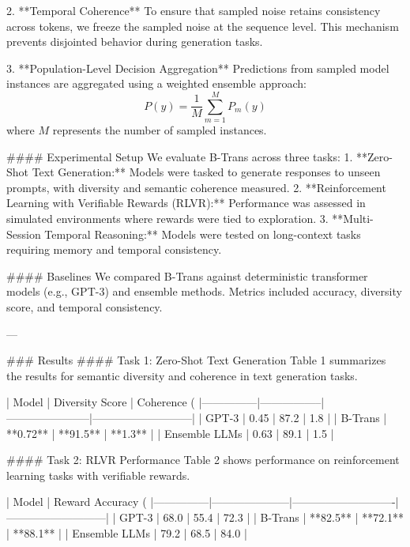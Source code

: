2. **Temporal Coherence**  
   To ensure that sampled noise retains consistency across tokens, we freeze the sampled noise at the sequence level. This mechanism prevents disjointed behavior during generation tasks.

3. **Population-Level Decision Aggregation**  
   Predictions from sampled model instances are aggregated using a weighted ensemble approach:  
   \[
   P(y) = \frac{1}{M} \sum_{m=1}^{M} P_{m}(y)
   \]  
   where \(M\) represents the number of sampled instances.

#### Experimental Setup  
We evaluate B-Trans across three tasks:  
1. **Zero-Shot Text Generation:** Models were tasked to generate responses to unseen prompts, with diversity and semantic coherence measured.  
2. **Reinforcement Learning with Verifiable Rewards (RLVR):** Performance was assessed in simulated environments where rewards were tied to exploration.  
3. **Multi-Session Temporal Reasoning:** Models were tested on long-context tasks requiring memory and temporal consistency.

#### Baselines  
We compared B-Trans against deterministic transformer models (e.g., GPT-3) and ensemble methods. Metrics included accuracy, diversity score, and temporal consistency.

---

### Results  
#### Task 1: Zero-Shot Text Generation  
Table 1 summarizes the results for semantic diversity and coherence in text generation tasks.

| Model         | Diversity Score | Coherence (%
|---------------|-----------------|-----------------------|---------------------------|
| GPT-3         | 0.45            | 87.2                 | 1.8                       |
| B-Trans       | **0.72**        | **91.5**             | **1.3**                   |
| Ensemble LLMs | 0.63            | 89.1                 | 1.5                       |

#### Task 2: RLVR Performance  
Table 2 shows performance on reinforcement learning tasks with verifiable rewards.

| Model         | Reward Accuracy (%
|---------------|---------------------|----------------------------|---------------------------|
| GPT-3         | 68.0                | 55.4                       | 72.3                      |
| B-Trans       | **82.5**            | **72.1**                   | **88.1**                  |
| Ensemble LLMs | 79.2                | 68.5                       | 84.0                      |

